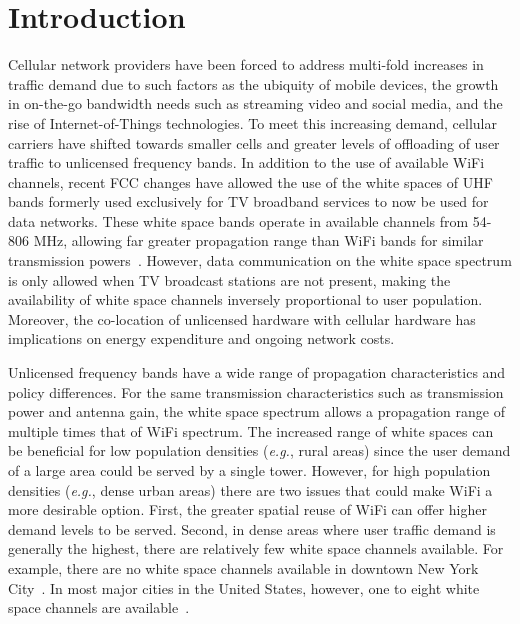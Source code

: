 \section{Introduction}
\label{sec:introduction}
Cellular network providers have been forced to address multi-fold increases in traffic demand due to such factors as the ubiquity of mobile devices, the growth in on-the-go bandwidth needs such as streaming video and social media, and the rise of Internet-of-Things technologies.
To meet this increasing demand, cellular carriers have shifted towards smaller cells and greater levels of offloading of user traffic to unlicensed frequency bands. In addition to the use of available WiFi channels, recent FCC changes have allowed the use of the white spaces of UHF bands formerly used exclusively for TV broadband services to now be used for data networks.
These white space bands operate in available channels from 54-806 MHz, allowing far greater propagation range than WiFi bands for similar transmission powers~\cite{balanis2012antenna}.
However, data communication on the white space
spectrum is only allowed when TV broadcast stations are not present, making
the availability of white space channels inversely proportional to user population. Moreover, the co-location of unlicensed hardware with cellular hardware has implications on energy expenditure and ongoing network costs.

Unlicensed frequency bands have a wide range of propagation characteristics and
policy differences. For the same transmission characteristics such as transmission power and
antenna gain, the white space spectrum allows a propagation range of multiple 
times that of WiFi spectrum. The increased range of white spaces can be beneficial for 
low population densities ({\it e.g.}, rural areas) since the user demand of a large area 
could be served by a single tower. However, for high population densities ({\it e.g.}, 
dense urban areas) there are two issues that could make WiFi a more desirable option.  
First, the greater spatial reuse of WiFi can offer higher demand levels to be served. 
Second, in dense areas where user traffic demand is generally the highest, there are 
relatively few white space channels available.  For example, there are no white space 
channels available in downtown New York City~\cite{googlespectrum}. In most major cities 
in the United States, however, one to eight white space channels are 
available~\cite{googlespectrum}.

